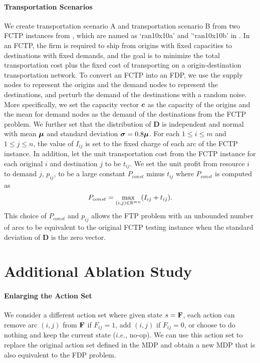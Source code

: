 \documentclass{article} %
\begin{document}
\paragraph{Transportation Scenarios}
We create transportation scenario A and transportation scenario B from two FCTP instances from \citet{mittelmann2005decision}, which are named as `ran10x10a' and '`ran10x10b' in \citet{mittelmann2005decision}. In an FCTP, the firm is required to ship from origins with fixed capacities to destinations with fixed demands, and the goal is to minimize the total transportation cost plus the fixed cost of transporting on a origin-destination transportation network. To convert an FCTP into an FDP, we use the supply nodes to represent the origins and the demand nodes to represent the destinations, and perturb the demand of the destinations with a random noise. More specifically, we set the capacity vector $\boldsymbol{c}$ as the capacity of the origins and the mean for demand nodes as the demand of the destinations from the FCTP problem. We further set that the distribution of $\mathbf{D}$ is independent and normal with mean $\boldsymbol{\mu}$ and standard deviation $\boldsymbol{\sigma} = 0.8\boldsymbol{\mu}$. For each $1\leq i\leq m$ and $1 \leq j\leq n$, the value of $I_{ij}$ is set to the fixed charge of each arc of the FCTP instance. In addition, let the unit transportation cost from the FCTP instance for each original $i$ and destination $j$ to be $t_{ij}$. We set the unit profit from resource $i$ to demand $j$, $p_{ij}$, to be a large constant $P_{const}$ minus $t_{ij}$ where $P_{const}$ is computed as 
$$P_{const} = \max_{(i,j)\in \mathbb{R}^{mn}} (I_{ij} + t_{ij}).$$
This choice of $P_{const}$ and $p_{ij}$ allows the FTP problem with an unbounded number of arcs to be equivalent to the original FCTP testing instance when the standard deviation of $\mathbf{D}$ is the zero vector. 



\section{Additional Ablation Study}

\paragraph{Enlarging the Action Set} 
We consider a different action set where given state $s=\mathbf{F}$, each action can remove arc $(i,j)$ from $\mathbf{F}$ if $F_{ij}=1$, add $(i,j)$ if $F_{ij}=0$, or choose to do nothing and keep the current state ($i.e.$, no-op). We can use this action set to replace the original action set defined in the MDP and obtain a new MDP that is also equivalent to the FDP problem. 
\end{document}
